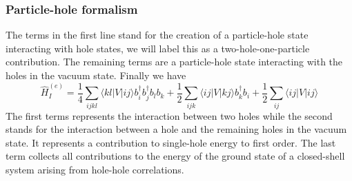\documentclass[compress]{beamer}
\newcommand*{\ket}[1]{|#1\rangle}
\newcommand*{\bra}[1]{\langle#1|}
\newcommand{\element}[3]
        {\bra{#1}#2\ket{#3}}
\begin{document}
\frame
{
  \frametitle{Particle-hole formalism}
\begin{small}
{\scriptsize
The terms in the first line  stand for the creation of a particle-hole state 
interacting with hole states, we will label this as a two-hole-one-particle contribution. 
The remaining terms are a particle-hole state interacting with the holes in the vacuum state. 
Finally we have 
\begin{equation}
	\hat{H}_I^{(e)} = \frac{1}{4}
		 \sum_{ijkl}
		 \element{kl}{V}{ij}b_i^\dagger b_j^\dagger b_l b_k+
	        \frac{1}{2}\sum_{ijk}\element{ij}{V}{kj}b_k^\dagger b_i
	        +\frac{1}{2}\sum_{ij}\element{ij}{V}{ij}\label{eq:2-70d}
\end{equation}
The first terms represents the 
interaction between two holes while the second stands for the interaction between a hole and the remaining holes in the vacuum state.
It represents a contribution to single-hole energy  to first order.
The last term collects all contributions to the energy of the ground state of a closed-shell system arising
from hole-hole correlations.
}
\end{small}
}
\end{document}
